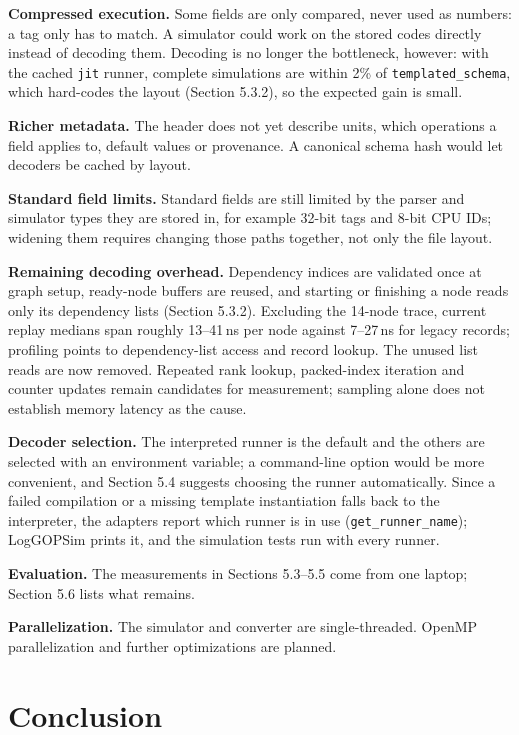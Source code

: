 \documentclass[10pt,a4paper]{article}
\begin{document}
\textbf{Compressed execution.} Some fields are only compared, never used as numbers: a tag only has to match. A simulator could work on the stored codes directly instead of decoding them. Decoding is no longer the bottleneck, however: with the cached \texttt{jit} runner, complete simulations are within 2\% of \texttt{templated\_schema}, which hard-codes the layout (Section 5.3.2), so the expected gain is small.

\textbf{Richer metadata.} The header does not yet describe units, which operations a field applies to, default values or provenance. A canonical schema hash would let decoders be cached by layout.

\textbf{Standard field limits.} Standard fields are still limited by the parser and simulator types they are stored in, for example 32-bit tags and 8-bit CPU IDs; widening them requires changing those paths together, not only the file layout.

\textbf{Remaining decoding overhead.} Dependency indices are validated once at graph setup, ready-node buffers are reused, and starting or finishing a node reads only its dependency lists (Section 5.3.2). Excluding the 14-node trace, current replay medians span roughly 13--41\,ns per node against 7--27\,ns for legacy records; profiling points to dependency-list access and record lookup. The unused list reads are now removed. Repeated rank lookup, packed-index iteration and counter updates remain candidates for measurement; sampling alone does not establish memory latency as the cause.

\textbf{Decoder selection.} The interpreted runner is the default and the others are selected with an environment variable; a command-line option would be more convenient, and Section 5.4 suggests choosing the runner automatically. Since a failed compilation or a missing template instantiation falls back to the interpreter, the adapters report which runner is in use (\texttt{get\_\allowbreak{}runner\_\allowbreak{}name}); LogGOPSim prints it, and the simulation tests run with every runner.

\textbf{Evaluation.} The measurements in Sections 5.3--5.5 come from one laptop; Section 5.6 lists what remains.

\textbf{Parallelization.} The simulator and converter are single-threaded. OpenMP parallelization and further optimizations are planned.

\hypertarget{conclusion}{}
\section{Conclusion}
\end{document}
